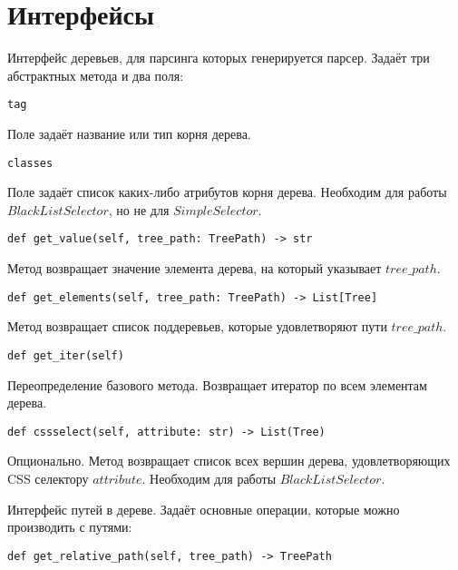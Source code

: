 \chapter{Интерфейсы}



Интерфейс деревьев, для парсинга которых генерируется парсер. Задаёт три абстрактных метода и два поля:
\\

\begin{lstlisting}
tag
\end{lstlisting}
Поле задаёт название или тип корня дерева.
\\

\begin{lstlisting}
classes
\end{lstlisting}
Поле задаёт список каких-либо атрибутов корня дерева. Необходим для работы $BlackListSelector$, но не для $SimpleSelector$.
\\

\begin{lstlisting}
def get_value(self, tree_path: TreePath) -> str
\end{lstlisting}
Метод возвращает значение элемента дерева, на который указывает $tree\_path$.
\\

\begin{lstlisting}
def get_elements(self, tree_path: TreePath) -> List[Tree]
\end{lstlisting}
Метод возвращает список поддеревьев, которые удовлетворяют пути $tree\_path$.
\\

\begin{lstlisting}
def get_iter(self)
\end{lstlisting}
Переопределение базового метода. Возвращает итератор по всем элементам дерева.
\\

\begin{lstlisting}
def cssselect(self, attribute: str) -> List(Tree)
\end{lstlisting}
Опционально. Метод возвращает список всех вершин дерева, удовлетворяющих CSS селектору $attribute$. Необходим для работы $BlackListSelector$.


Интерфейс путей в дереве. Задаёт основные операции, которые можно производить с путями:
\\

\begin{lstlisting}
def get_relative_path(self, tree_path) -> TreePath
\end{lstlisting}

